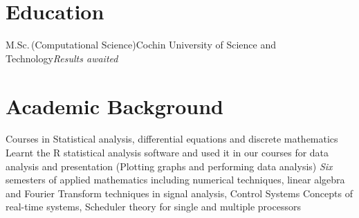 \documentclass [a4paper,11pt]{moderncv}
\begin{document}
\maketitle
{}

\section{Education}
 {M.Sc.$\,$(Computational Science)}{Cochin University of Science and Technology}{}{\textit{Results awaited}}{}

\section{Academic Background}
 {Courses in Statistical analysis, differential equations and discrete mathematics}
 {Learnt the R statistical analysis software and used it in our courses for data analysis and presentation (Plotting graphs and performing data analysis)}
 {\emph{Six} semesters of applied mathematics including numerical techniques, linear algebra and Fourier Transform techniques in signal analysis, Control Systems}
 {Concepts of real-time systems, Scheduler theory for single and multiple processors}
\end{document}
